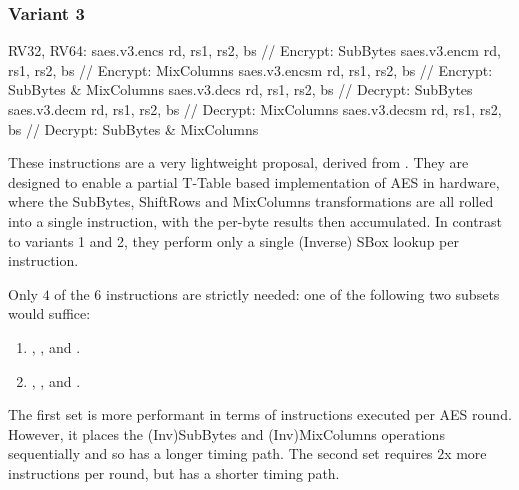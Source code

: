 \subsubsection{Variant 3}

\begin{cryptoisa}
RV32, RV64:
    saes.v3.encs      rd, rs1, rs2, bs // Encrypt: SubBytes
    saes.v3.encm      rd, rs1, rs2, bs // Encrypt: MixColumns
    saes.v3.encsm     rd, rs1, rs2, bs // Encrypt: SubBytes & MixColumns
    saes.v3.decs      rd, rs1, rs2, bs // Decrypt: SubBytes
    saes.v3.decm      rd, rs1, rs2, bs // Decrypt: MixColumns
    saes.v3.decsm     rd, rs1, rs2, bs // Decrypt: SubBytes & MixColumns
\end{cryptoisa}

These instructions are a very lightweight proposal, derived from
\cite{MJS:20}.
They are designed to enable a partial T-Table based implementation
of AES in hardware, where the SubBytes, ShiftRows and MixColumns
transformations are all rolled into a single instruction, with the
per-byte results then accumulated.
In contrast to variants 1 and 2, they perform only a single (Inverse) SBox
lookup per instruction.

Only $4$ of the $6$ instructions are strictly needed: one of the following two
subsets would suffice:
\begin{enumerate}
\item {},
      ,
       and
      .
\item {},
      ,
       and
      .
\end{enumerate}

The first set is more performant in terms of instructions executed per
AES round.
However, it places the (Inv)SubBytes and (Inv)MixColumns operations
sequentially and so has a longer timing path.
The second set requires $2$x more instructions per round, but has a
shorter timing path.

